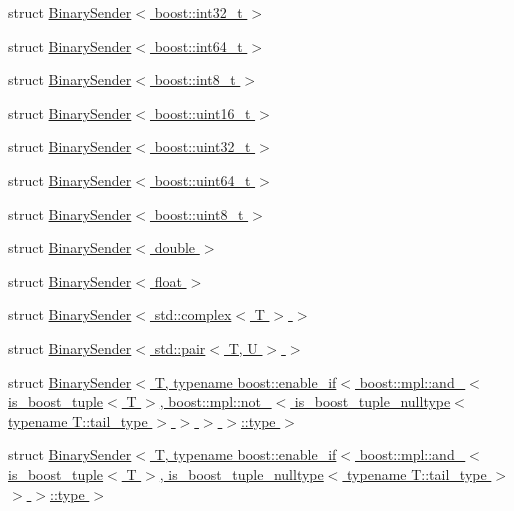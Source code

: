 \begin{DoxyCompactItemize}
\item 
struct \hyperlink{structgnuplotio_1_1_binary_sender_3_01boost_1_1int32__t_01_4}{Binary\+Sender$<$ boost\+::int32\+\_\+t $>$}
\item 
struct \hyperlink{structgnuplotio_1_1_binary_sender_3_01boost_1_1int64__t_01_4}{Binary\+Sender$<$ boost\+::int64\+\_\+t $>$}
\item 
struct \hyperlink{structgnuplotio_1_1_binary_sender_3_01boost_1_1int8__t_01_4}{Binary\+Sender$<$ boost\+::int8\+\_\+t $>$}
\item 
struct \hyperlink{structgnuplotio_1_1_binary_sender_3_01boost_1_1uint16__t_01_4}{Binary\+Sender$<$ boost\+::uint16\+\_\+t $>$}
\item 
struct \hyperlink{structgnuplotio_1_1_binary_sender_3_01boost_1_1uint32__t_01_4}{Binary\+Sender$<$ boost\+::uint32\+\_\+t $>$}
\item 
struct \hyperlink{structgnuplotio_1_1_binary_sender_3_01boost_1_1uint64__t_01_4}{Binary\+Sender$<$ boost\+::uint64\+\_\+t $>$}
\item 
struct \hyperlink{structgnuplotio_1_1_binary_sender_3_01boost_1_1uint8__t_01_4}{Binary\+Sender$<$ boost\+::uint8\+\_\+t $>$}
\item 
struct \hyperlink{structgnuplotio_1_1_binary_sender_3_01double_01_4}{Binary\+Sender$<$ double $>$}
\item 
struct \hyperlink{structgnuplotio_1_1_binary_sender_3_01float_01_4}{Binary\+Sender$<$ float $>$}
\item 
struct \hyperlink{structgnuplotio_1_1_binary_sender_3_01std_1_1complex_3_01_t_01_4_01_4}{Binary\+Sender$<$ std\+::complex$<$ T $>$ $>$}
\item 
struct \hyperlink{structgnuplotio_1_1_binary_sender_3_01std_1_1pair_3_01_t_00_01_u_01_4_01_4}{Binary\+Sender$<$ std\+::pair$<$ T, U $>$ $>$}
\item 
struct \hyperlink{structgnuplotio_1_1_binary_sender_3_01_t_00_01typename_01boost_1_1enable__if_3_01boost_1_1mpl_1_916ff7a758aa0b8917fd3b30ff275f06}{Binary\+Sender$<$ T, typename boost\+::enable\+\_\+if$<$ boost\+::mpl\+::and\+\_\+$<$ is\+\_\+boost\+\_\+tuple$<$ T $>$, boost\+::mpl\+::not\+\_\+$<$ is\+\_\+boost\+\_\+tuple\+\_\+nulltype$<$ typename T\+::tail\+\_\+type $>$ $>$ $>$ $>$\+::type $>$}
\item 
struct \hyperlink{structgnuplotio_1_1_binary_sender_3_01_t_00_01typename_01boost_1_1enable__if_3_01boost_1_1mpl_1_29e1098ca8b7afc20f2ca0bc2e79506a}{Binary\+Sender$<$ T, typename boost\+::enable\+\_\+if$<$ boost\+::mpl\+::and\+\_\+$<$ is\+\_\+boost\+\_\+tuple$<$ T $>$, is\+\_\+boost\+\_\+tuple\+\_\+nulltype$<$ typename T\+::tail\+\_\+type $>$ $>$ $>$\+::type $>$}

\end{DoxyCompactItemize}
